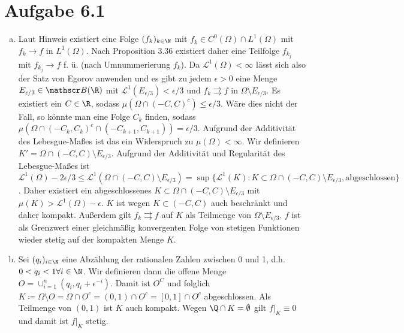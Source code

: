\documentclass{article}
\begin{document}
\def\headheight{25pt}
    \section*{Aufgabe 6.1}
    \begin{enumerate}[(a)]
        \item Laut Hinweis existiert eine Folge $(f_k)_{k\in \N}$ mit $f_k \in C^0(\Omega) \cap L^1(\Omega)$ mit $f_k \to f$ in $L^1(\Omega)$.
        Nach Proposition 3.36 existiert daher eine Teilfolge $f_{k_j}$ mit $f_{k_j} \to f$ f. ü. (nach Umnummerierung $f_k$). 
        Da $\mathscr L^1(\Omega) < \infty$ lässt sich also der Satz von Egorov anwenden und es gibt zu jedem $\epsilon > 0$ eine Menge $E_{\epsilon /3} \in \mathscr B(\R)$ mit $\mathscr L^1 (E_{\epsilon/3}) < \epsilon/3$ und $f_k \rightrightarrows f$ in $\Omega \setminus E_{\epsilon / 3}$. 
        Es existiert ein $C\in \R$, sodass $\mu(\Omega \cap (-C,C)^c) \leq \epsilon /3$. Wäre dies nicht der Fall, so könnte man eine Folge $C_k$ finden, sodass $\mu(\Omega \cap (-C_k, C_k)^c \cap (-C_{k+1}, C_{k+1})) = \epsilon/3$. Aufgrund der Additivität des Lebesgue-Maßes ist das ein Widerspruch zu $\mu(\Omega) < \infty$. 
        Wir definieren $K' = \Omega \cap (-C, C) \setminus E_{\epsilon/3}$.
        Aufgrund der Additivität und Regularität des Lebesgue-Maßes ist $\mathscr L^1(\Omega) - {2\epsilon / 3} \leq \mathscr L^1(\Omega \cap (-C, C) \setminus E_{\epsilon/3}) = \sup \{\mathscr L^1(K)\colon K\subset \Omega \cap (-C, C) \setminus E_{\epsilon/3}, \text{abgeschlossen}\}$. Daher existiert ein abgeschlossenes $K \subset \Omega \cap (-C, C) \setminus E_{\epsilon/3}$ mit $\mu(K) > \mathscr L^1(\Omega) - \epsilon$. $K$ ist wegen $K \subset (-C, C)$ auch beschränkt und daher kompakt. Außerdem gilt $f_k \rightrightarrows f$ auf $K$ als Teilmenge von $\Omega \setminus E_{\epsilon/3}$. $f$ ist als Grenzwert einer gleichmäßig konvergenten Folge von stetigen Funktionen wieder stetig auf der kompakten Menge $K$.
        \item Sei $(q_i)_{i\in \N}$ eine Abzählung der rationalen Zahlen zwischen 0 und 1, d.h. $0 < q_i < 1 \forall i \in \N$.
        Wir definieren dann die offene Menge $O = \cup_{i=1}^n (q_i, q_i + \epsilon^{-i})$. Damit ist $O^C$ und folglich $K \coloneqq \Omega \setminus O = \Omega \cap O^c = (0,1) \cap O^c = [0,1] \cap O^c$ abgeschlossen. Als Teilmenge von $(0,1)$ ist $K$ auch kompakt. Wegen $\Q \cap K = \emptyset$ gilt $f|_K \equiv 0$ und damit ist $f|_K$ stetig.
    \end{enumerate}
\end{document}

